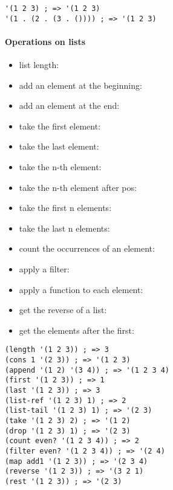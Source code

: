 \documentclass[a4paper,landscape,10pt]{article}
\begin{document}
\begin{multicols*}{2}
  \begin{lstlisting}[language=Racket]
'(1 2 3) ; => '(1 2 3)
'(1 . (2 . (3 . ()))) ; => '(1 2 3)
\end{lstlisting}

  \paragraph{Operations on lists}

  \begin{itemize}
    \item list length: 
    \item add an element at the beginning: 
    \item add an element at the end: 
    \item take the first element: 
    \item take the last element: 
    \item take the n-th element: 
    \item take the n-th element after pos: 
    \item take the first n elements: 
    \item take the last n elements: 
    \item count the occurrences of an element: 
    \item apply a filter: 
    \item apply a function to each element: 
    \item get the reverse of a list: 
    \item get the elements after the first: 
  \end{itemize}

  \begin{lstlisting}[language=Racket]
(length '(1 2 3)) ; => 3
(cons 1 '(2 3)) ; => '(1 2 3)
(append '(1 2) '(3 4)) ; => '(1 2 3 4)
(first '(1 2 3)) ; => 1
(last '(1 2 3)) ; => 3
(list-ref '(1 2 3) 1) ; => 2
(list-tail '(1 2 3) 1) ; => '(2 3)
(take '(1 2 3) 2) ; => '(1 2)
(drop '(1 2 3) 1) ; => '(2 3)
(count even? '(1 2 3 4)) ; => 2
(filter even? '(1 2 3 4)) ; => '(2 4)
(map add1 '(1 2 3)) ; => '(2 3 4)
(reverse '(1 2 3)) ; => '(3 2 1)
(rest '(1 2 3)) ; => '(2 3)
\end{lstlisting}


\end{multicols*}
\end{document}
